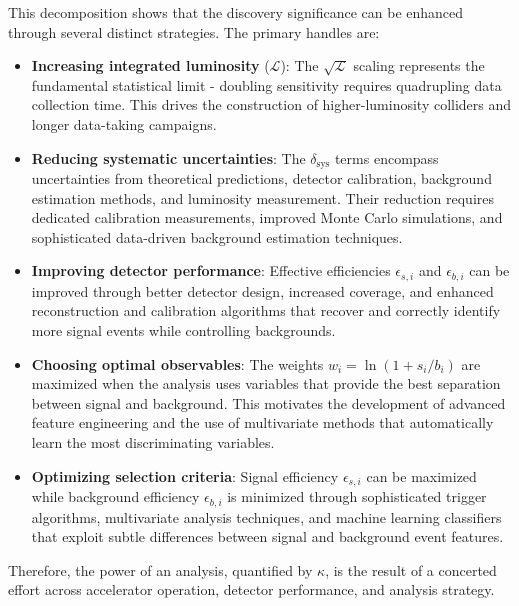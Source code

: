 This decomposition shows that the discovery significance can be enhanced through several distinct strategies. The primary handles are:

\begin{itemize}
    \item \textbf{Increasing integrated luminosity} ($\mathcal{L}$): The $\sqrt{\mathcal{L}}$ scaling represents the fundamental statistical limit - doubling sensitivity requires quadrupling data collection time. This drives the construction of higher-luminosity colliders and longer data-taking campaigns.
    
    \item \textbf{Reducing systematic uncertainties}: The $\delta_{\text{sys}}$ terms encompass uncertainties from theoretical predictions, detector calibration, background estimation methods, and luminosity measurement. Their reduction requires dedicated calibration measurements, improved Monte Carlo simulations, and sophisticated data-driven background estimation techniques.

		\item \textbf{Improving detector performance}: Effective efficiencies $\epsilon_{s,i}$ and $\epsilon_{b,i}$ can be improved through better detector design, increased coverage, and enhanced reconstruction and calibration algorithms that recover and correctly identify more signal events while controlling backgrounds.

    \item \textbf{Choosing optimal observables}: The weights $w_i = \ln(1 + s_i/b_i)$ are maximized when the analysis uses variables that provide the best separation between signal and background. This motivates the development of advanced feature engineering and the use of multivariate methods that automatically learn the most discriminating variables.

    \item \textbf{Optimizing selection criteria}: Signal efficiency $\epsilon_{s,i}$ can be maximized while background efficiency $\epsilon_{b,i}$ is minimized through sophisticated trigger algorithms, multivariate analysis techniques, and machine learning classifiers that exploit subtle differences between signal and background event features.

\end{itemize}

Therefore, the power of an analysis, quantified by $\kappa$, is the result of a concerted effort across accelerator operation, detector performance, and analysis strategy.

